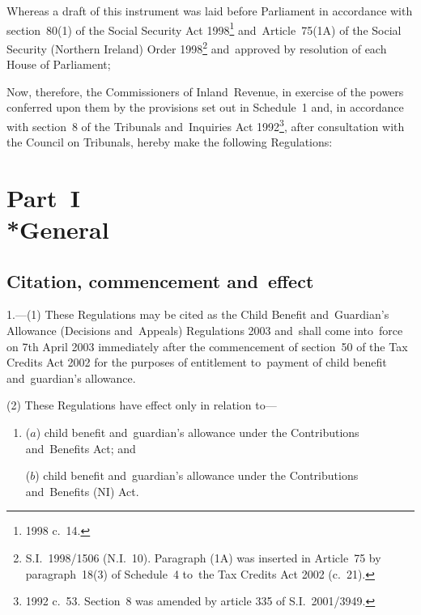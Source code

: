 \documentclass[12pt,a4paper]{article}
\title{\regstitle}
\author{S.I.\ 2003 No.\ 916}
\date{Made
27th March 2003\\
Coming into~force
7th April 2003
}
\begin{document}
\maketitle

\noindent
Whereas a draft of this instrument was laid before Parliament in accordance with section~80(1) of the Social Security Act 1998\footnote{1998 c.~14.} and~Article~75(1A) of the Social Security (Northern Ireland) Order 1998\footnote{S.I.~1998/1506 (N.I.~10). Paragraph (1A) was inserted in Article~75 by paragraph~18(3) of Schedule~4 to~the Tax Credits Act 2002 (c.~21).} and~approved by resolution of each House of Parliament;

Now, therefore, the Commissioners of Inland~Revenue, in exercise of the powers conferred upon them by the provisions set out in Schedule~1 and, in accordance with section~8 of the Tribunals and~Inquiries Act 1992\footnote{1992 c.~53. Section~8 was amended by article 335 of S.I.~2001/3949.}, after consultation with the Council on Tribunals, hereby make the following Regulations: 

{\sloppy

\tableofcontents

}

\bigskip

\setcounter{secnumdepth}{-2}

\section[Part~I --- General]{Part~I\\*General}

\renewcommand\parthead{--- Part~I}

\subsection[1. Citation, commencement and~effect]{Citation, commencement and~effect}

1.---(1)  These Regulations may be cited as the Child Benefit and~Guardian’s Allowance (Decisions and~Appeals) Regulations 2003 and~shall come into~force on 7th April 2003 immediately after the commencement of section~50 of the Tax Credits Act 2002 for the purposes of entitlement to~payment of child benefit and~guardian’s allowance.

(2) These Regulations have effect only in relation to—
\begin{enumerate}\item[]
($a$) child benefit and~guardian’s allowance under the Contributions and~Benefits Act; and

($b$) child benefit and~guardian’s allowance under the Contributions and~Benefits (NI) Act.
\end{enumerate}
\end{document}
